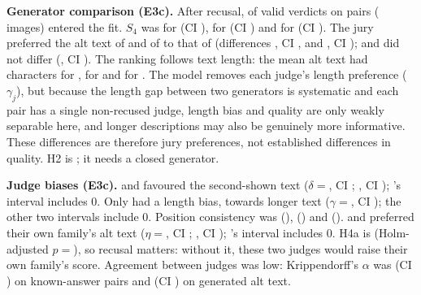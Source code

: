 \textbf{Generator comparison (E3c).} After recusal,  of  valid
verdicts on  pairs ( images) entered the fit. $S_4$ was
 for \MI{} (CI ),
 for \GM{} (CI ) and 
for \QV{} (CI ). The jury preferred the alt text of \MI{} and of \GM{} to that of \QV{} (differences , CI
, and
, CI
); \GM{} and \MI{} did not differ
(, CI
). The ranking follows text length: the mean
alt text had  characters for \MI,
 for \GM{} and  for \QV. The
model removes each judge's length preference ($\gamma_j$), but because the length gap between two
generators is systematic and each pair has a single non-recused judge, length bias and quality
are only weakly separable here, and longer descriptions may also be genuinely more informative. These differences are therefore
jury preferences, not established differences in quality.
H2 is ; it needs a closed generator.

\textbf{Judge biases (E3c).} \GM{} and \QV{} favoured the second-shown text
($\delta={}$, CI ;
, CI ); \MI's interval includes 0.
Only \GM{} had a length bias, towards longer text ($\gamma={}$, CI
); the other two intervals include 0. Position consistency was
 (\QV),  (\GM) and 
(\MI). \QV{} and \GM{} preferred their own family's alt text
($\eta={}$, CI ; ,
CI ); \MI's interval includes 0. H4a is 
(Holm-adjusted $p={}$), so recusal matters: without it, these two judges would raise
their own family's score. Agreement between judges was low: Krippendorff's $\alpha$ was
 (CI ) on known-answer pairs and  (CI
) on generated alt text.

